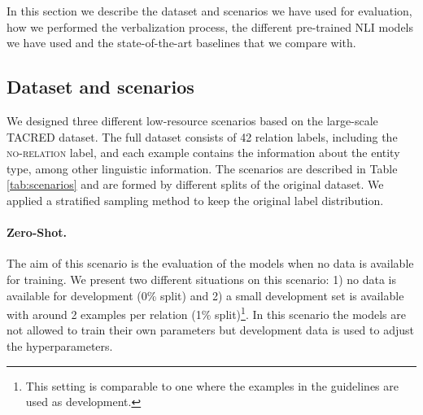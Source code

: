 \documentclass[11pt]{article}
\begin{document}
In this section we describe the dataset and scenarios we have used for evaluation, how we performed the verbalization process, the different pre-trained NLI models we have used and the state-of-the-art baselines that we compare with.

\subsection{Dataset and scenarios}


We designed three different low-resource scenarios based on the large-scale TACRED \cite{zhang2017tacred} dataset. The full dataset consists of 42 relation labels, including the \textsc{no-relation} label, and each example contains the information about the entity type, among other linguistic information. The scenarios are described in Table \ref{tab:scenarios} and are formed by different splits of the original dataset. We applied a stratified sampling method to keep the original label distribution. 





\paragraph{Zero-Shot.} The aim of this scenario is the evaluation of the models when no data is available for training. We present two different  situations on this scenario: 1) no data is available for development (0\% split) and 2) a small development set is available with around 2 examples per relation (1\% split)\footnote{This setting is comparable to one where the examples in the guidelines are used as development.}. In this scenario the models are not allowed to train their own parameters but development data is used to adjust the hyperparameters.
\end{document}
